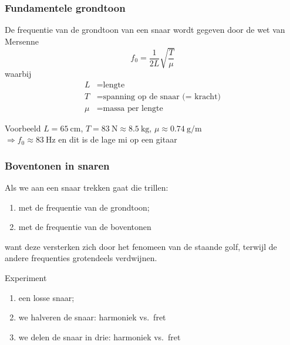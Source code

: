 \documentclass[compress, darktitle, framenumber, totalframenumber]{beamer}
\begin{document}
\begin{frame}
  \frametitle{Fundamentele grondtoon}

  De frequentie van de grondtoon van een snaar wordt gegeven door de \alert{wet van Mersenne}
  \begin{equation}
    f_0=\frac{1}{2L}\sqrt{\frac{T}{\mu}}
  \end{equation}
  waarbij
  \begin{equation}
    \begin{aligned}
      L&=\text{lengte} \\
      T&=\text{spanning op de snaar (= kracht)} \\
      \mu&=\text{massa per lengte}
    \end{aligned}
  \end{equation}
  \pause
  \begin{block}{Voorbeeld}
    $L=\SI{65}{\centi\meter}$, $T=\SI{83}{\newton}\approx\SI{8.5}{\kilo\gram}$, $\mu\approx\SI{0.74}{\gram\per\meter}$ \\
    $\Rightarrow f_0\approx\SI{83}{\hertz}$ en dit is de lage mi op een gitaar
  \end{block}
\end{frame}

\begin{frame}
  \frametitle{Boventonen in snaren}

  Als we aan een snaar trekken gaat die trillen:
  \begin{enumerate}
    \item met de frequentie van de grondtoon;
    \item met de frequentie van de boventonen
  \end{enumerate}
  want deze versterken zich door het fenomeen van de staande golf, terwijl de andere frequenties grotendeels verdwijnen.
  \pause
  \begin{block}{Experiment}
    \begin{enumerate}
      \item een losse snaar;
        \pause
      \item we halveren de snaar: harmoniek vs.\ fret
        \pause
      \item we delen de snaar in drie: harmoniek vs.\ fret
    \end{enumerate}
  \end{block}
\end{frame}
\end{document}
